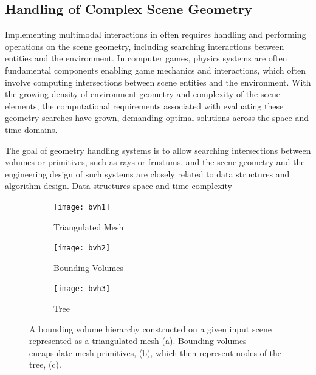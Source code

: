 \subsection{Handling of Complex Scene Geometry}\label{sec:bg-geometry-handling}
Implementing multimodal interactions in  often requires handling and performing operations on the scene geometry, including searching interactions between entities and the environment. In computer games, physics systems are often fundamental components enabling game mechanics and interactions, which often involve computing intersections between scene entities and the environment. With the growing density of environment geometry and complexity of the scene elements, the computational requirements associated with evaluating these geometry searches have grown, demanding optimal solutions across the space and time domains.\par
The goal of geometry handling systems is to allow searching intersections between volumes or primitives, such as rays or frustums, and the scene geometry and the engineering design of such systems are closely related to data structures and algorithm design. Data structures space and time complexity
\begin{figure}
    \centering
    \begin{subfigure}[t]{0.3\textwidth}
       \centering
       \texttt{[image: bvh1]}
       \caption{Triangulated Mesh}\label{fig:sub_bvh1}
    \end{subfigure}
    \hfill
    \begin{subfigure}[t]{0.3\textwidth}
       \centering
       \texttt{[image: bvh2]}
       \caption{Bounding Volumes}\label{fig:sub_bvh2}
    \end{subfigure}

    \begin{subfigure}[t]{0.8\textwidth}
        \centering
        \texttt{[image: bvh3]}
        \caption{Tree}\label{fig:sub_bvh3}
    \end{subfigure}
    \caption{A bounding volume hierarchy constructed on a given input scene represented as a triangulated mesh (a). Bounding volumes encapsulate mesh primitives, (b), which then represent nodes of the tree, (c).}\label{fig:bvh-diagram}
\end{figure}


